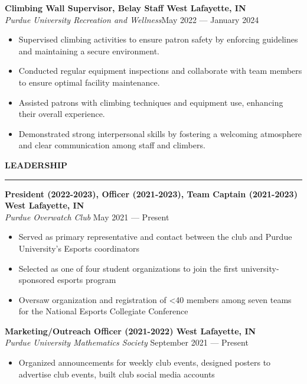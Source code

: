 \documentclass[letter,11pt]{article}
\begin{document}
\textbf{Climbing Wall Supervisor, Belay Staff \hfill West Lafayette, IN}\\
\emph{Purdue University Recreation and Wellness}\hfill May 2022 --- January 2024 \\
\vspace*{-1.75em}
\begin{itemize}[label=-, leftmargin=*, labelwidth=1.5cm, align=left, noitemsep]
  \item Supervised climbing activities to ensure patron safety by enforcing guidelines and maintaining a secure environment.
    \item Conducted regular equipment inspections and collaborate with team members to ensure optimal facility maintenance.
    \item Assisted patrons with climbing techniques and equipment use, enhancing their overall experience.
    \item Demonstrated strong interpersonal skills by fostering a welcoming atmosphere and clear communication among staff and climbers.
  \end{itemize}
\vspace*{0.5em}

\textbf{LEADERSHIP}

\vspace*{-1.25em}
\rule{\textwidth}{1.2pt}
\textbf{President (2022-2023), Officer (2021-2023), Team Captain (2021-2023) \hfill West Lafayette, IN}\\
\emph{Purdue Overwatch Club} \hfill May 2021 --- Present\\
\vspace*{-1.75em}
\begin{itemize}[label=-, leftmargin=*, align=left, noitemsep]
    \item Served as primary representative and contact between the club and Purdue University's Esports coordinators
    \item Selected as one of four student organizations to join the first university-sponsored esports program
    \item Oversaw organization and registration of <40 members among seven teams for the National Esports Collegiate Conference
\end{itemize}
\vspace*{-0.25em}

\textbf{Marketing/Outreach Officer (2021-2022) \hfill West Lafayette, IN} \\
\emph{Purdue University Mathematics Society} \hfill September 2021 --- Present\\
\vspace*{-1.75em}
\begin{itemize}[label=-, leftmargin=*, labelwidth=1.5cm, align=left, noitemsep]
    \item Organized announcements for weekly club events, designed posters to advertise club events, built club social media accounts
\end{itemize}
\vspace*{0.5em}
\end{document}
